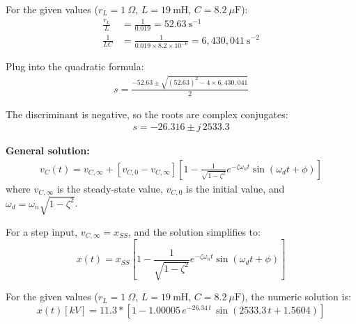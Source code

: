 For the given values ($r_L = 1~\Omega$, $L = 19~\text{mH}$, $C = 8.2~\mu\text{F}$):
\begin{align*}
    \frac{r_L}{L} &= \frac{1}{0.019} = 52.63~\text{s}^{-1} \\
    \frac{1}{L C} &= \frac{1}{0.019 \times 8.2 \times 10^{-6}} = 6,430,041~\text{s}^{-2}
\end{align*}

Plug into the quadratic formula:
\begin{align*}
    s = \frac{-52.63 \pm \sqrt{(52.63)^2 - 4 \times 6,430,041}}{2}
\end{align*}

The discriminant is negative, so the roots are complex conjugates:
\begin{align*}
    s = -26.316 \pm j\,2533.3
\end{align*}


    \begin{center}
    \end{center}

\vspace{1em}
	\textbf{General solution:}
\begin{align*}
    v_C(t) = v_{C,\infty} + \left[v_{C,0} - v_{C,\infty}\right] \left[1 - \frac{1}{\sqrt{1-\zeta^2}} e^{-\zeta \omega_n t} \sin(\omega_d t + \phi)\right]
\end{align*}
where $v_{C,\infty}$ is the steady-state value, $v_{C,0}$ is the initial value, and $\omega_d = \omega_n \sqrt{1-\zeta^2}$.

For a step input, $v_{C,\infty} = x_{SS}$, and the solution simplifies to:
\[
\boxed{
    x(t) = x_{SS} \left[1 - \frac{1}{\sqrt{1-\zeta^2}} e^{-\zeta \omega_n t} \sin(\omega_d t + \phi)\right]
}
\]

For the given values ($r_L = 1~\Omega$, $L = 19~\text{mH}$, $C = 8.2~\mu\text{F}$), the numeric solution is:
\[
\boxed{
    x(t) [kV] = 11.3 * \left[1 - 1.00005 \, e^{-26.34\, t} \, \sin(2533.3\, t + 1.5604)\right]
}
\]